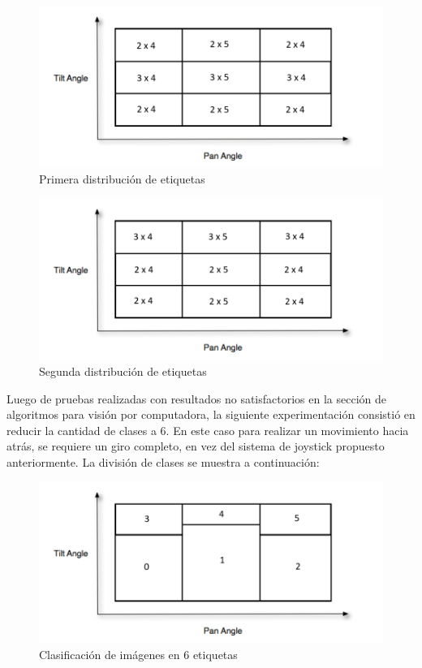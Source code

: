 \begin{figure}[H]
	\centering
	\includegraphics[scale=1]{figures/clasi01.png}
	\caption{Primera distribución de etiquetas}
	\label{fig:img3}
\end{figure}

\begin{figure}[H]
	\centering
	\includegraphics[scale=1]{figures/clasi02.png}
	\caption{Segunda distribución de etiquetas}
	\label{fig:img4}
\end{figure}

Luego de pruebas realizadas con resultados no satisfactorios en la sección de algoritmos para visión por computadora, la siguiente experimentación consistió en reducir la cantidad de clases a 6. En este caso para realizar un movimiento hacia atrás, se requiere un giro completo, en vez del sistema de joystick propuesto anteriormente. La división de clases se muestra a continuación:

\begin{figure}[H]
	\centering
	\includegraphics[scale=1]{figures/clasi1.png}
	\caption{Clasificación de imágenes en 6 etiquetas}
	\label{fig:img5}
\end{figure}

